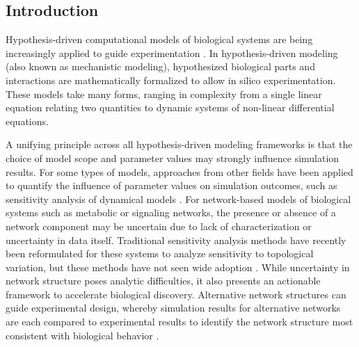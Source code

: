\documentclass[11pt,twocolumn,notitlepage,openany,twoside]{book}
\begin{document}
\begin{refsection}
\section{Introduction}

Hypothesis-driven computational models of biological systems are being increasingly applied to guide experimentation \cite{Kitano2002-az}. In hypothesis-driven modeling (also known as mechanistic modeling), hypothesized biological parts and interactions are mathematically formalized to allow in silico experimentation. These models take many forms, ranging in complexity from a single linear equation relating two quantities to dynamic systems of non-linear differential equations.

A unifying principle across all hypothesis-driven modeling frameworks is that the choice of model scope and parameter values may strongly influence simulation results. For some types of models, approaches from other fields have been applied to quantify the influence of parameter values on simulation outcomes, such as sensitivity analysis of dynamical models \cite{Marino2008-jt}. For network-based models of biological systems such as metabolic or signaling networks, the presence or absence of a network component may be uncertain due to lack of characterization or uncertainty in data itself. Traditional sensitivity analysis methods have recently been reformulated for these systems to analyze sensitivity to topological variation, but these methods have not seen wide adoption \cite{Babtie2014-vy}. While uncertainty in network structure poses analytic difficulties, it also presents an actionable framework to accelerate biological discovery. Alternative network structures can guide experimental design, whereby simulation results for alternative networks are each compared to experimental results to identify the network structure most consistent with biological behavior \cite{Medlock2018-kx,Silk2014-rv}.


\end{refsection}
\end{document}
